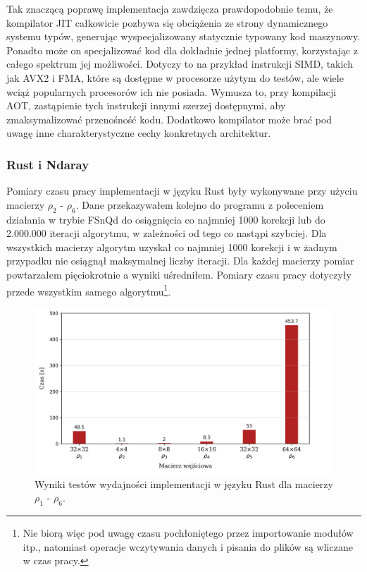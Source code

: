 \documentclass[11pt, a4paper]{article}
\begin{document}
\begin{sloppypar}
    Tak znaczącą poprawę implementacja zawdzięcza prawdopodobnie temu, że kompilator JIT
    całkowicie pozbywa się obciążenia ze strony dynamicznego systemu typów, generując wyspecjalizowany
    statycznie typowany kod maszynowy. Ponadto może on specjalizować kod dla dokładnie
    jednej platformy, korzystając z całego spektrum jej możliwości. Dotyczy to na
    przykład instrukcji SIMD, takich jak AVX2 i FMA, które są dostępne w procesorze
    użytym do testów, ale wiele wciąż popularnych procesorów ich nie posiada. Wymusza to,
    przy kompilacji AOT, zastąpienie tych instrukcji innymi szerzej dostępnymi, aby zmaksymalizować
    przenośność kodu. Dodatkowo kompilator może brać pod uwagę inne charakterystyczne
    cechy konkretnych architektur.

    \FloatBarrier

    \subsubsection{ Rust i Ndaray}


    Pomiary czasu pracy implementacji w języku Rust były wykonywane przy użyciu macierzy
    $\rho_{2}$ - $\rho_{6}$. Dane przekazywałem kolejno do programu z poleceniem
    działania w trybie FSnQd do osiągnięcia co najmniej 1000 korekcji lub do 2.000.000 iteracji
    algorytmu, w zależności od tego co nastąpi szybciej. Dla wszystkich macierzy algorytm
    uzyskał co najmniej 1000 korekcji i w żadnym przypadku nie osiągnął maksymalnej liczby
    iteracji. Dla każdej macierzy pomiar powtarzałem pięciokrotnie a wyniki uśredniłem. Pomiary
    czasu pracy dotyczyły przede wszystkim samego algorytmu\footnote{Nie biorą więc pod
    uwagę czasu pochłoniętego przez importowanie modułów itp., natomiast operacje
    wczytywania danych i pisania do plików są wliczane w czas pracy.}.

    \begin{figure}[ht]
      \centering
      \includegraphics[width=1.0\textwidth]{"resources/rust_performance_tests.png"}
      \caption{Wyniki testów wydajności implementacji w języku Rust dla macierzy $\rho_{1}$ - $\rho
      _{6}$.}
      \label{rust-double-precision}
    \end{figure}


\end{sloppypar}
\end{document}
